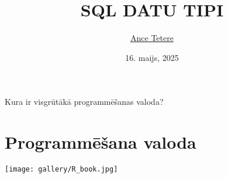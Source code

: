 \documentclass{beamer}
\title{SQL DATU TIPI}
\author{\href{mailto:Ance.Tetere@csp.gov.lv}{Ance Tetere}}
\date{16. maijs, 2025}
\begin{document}
    \maketitle

    \begin{frame}
            \vspace{-1cm}
            \centering Kura ir visgrūtākā programmēšanas valoda? \\ \pause
            \vspace{5mm}
            \centering \color[RGB]{112, 0, 0}{Pirmā programmēšanas valoda.}
    \end{frame}




    \section{Programmēšana valoda}

    \begin{frame}
    \centering
    \vspace{-2cm}
    \texttt{[image: gallery/R\_book.jpg]}
    \end{frame}
\end{document}
